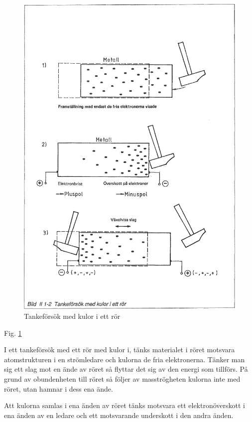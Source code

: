 \begin{figure}
\begin{center}
\includegraphics[width=\textwidth]{images/bild_2_1-02}
\caption{Tankeförsök med kulor i ett rör}
\label{fig:BildII1-2}
\end{center}
\end{figure}

Fig. \ref{fig:BildII1-2}

I ett tankeförsök med ett rör med kulor i, tänks materialet i röret motsvara
atomstrukturen i en strömledare och kulorna de fria elektronerna. Tänker man
sig ett slag mot en ände av röret så flyttar det sig av den energi som
tillförs. På grund av obundenheten till röret så följer av masströgheten
kulorna inte med röret, utan hamnar i dess ena ände.

Att kulorna samlas i ena änden av röret tänks motsvara ett elektronöverskott i
ena änden av en ledare och ett motsvarande underskott i den andra änden.

